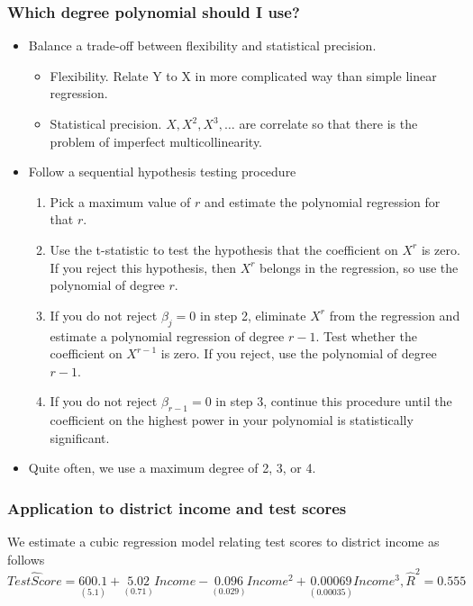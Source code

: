 \documentclass[a4paper,11pt]{article}
\begin{document}
\subsubsection*{Which degree polynomial should I use?}
\label{sec:orgbc950fd}
\begin{itemize}
\item Balance a trade-off between flexibility and statistical precision.
\begin{itemize}
\item Flexibility. Relate Y to X in more complicated way than simple
linear regression.
\item Statistical precision. \(X, X^2, X^3, \ldots\) are correlate so
that there is the problem of imperfect multicollinearity.
\end{itemize}
\item Follow a sequential hypothesis testing procedure
\begin{enumerate}
\item Pick a maximum value of \(r\) and estimate the polynomial
regression for that \(r\).
\item Use the t-statistic to test the hypothesis that the coefficient
on \(X^r\) is zero. If you reject this hypothesis, then \(X^r\)
belongs in the regression, so use the polynomial of degree \(r\).
\item If you do not reject \(\beta_j = 0\) in step 2, eliminate \(X^r\)
from the regression and estimate a polynomial regression of
degree \(r-1\). Test whether the coefficient on \(X^{r-1}\) is
zero. If you reject, use the polynomial of degree \(r-1\).
\item If you do not reject \(\beta_{r-1} = 0\) in step 3, continue this
procedure until the coefficient on the highest power in your
polynomial is statistically significant.
\end{enumerate}
\item Quite often, we use a maximum degree of 2, 3, or 4.
\end{itemize}

\subsubsection*{Application to district income and test scores}
\label{sec:orgb540783}
We estimate a cubic regression model relating test scores to district
income as follows
\begin{equation*}
\widehat{TestScore} = \underset{\displaystyle (5.1)}{600.1} 
                    + \underset{\displaystyle (0.71)}{5.02} Income
                    - \underset{\displaystyle (0.029)}{0.096} Income^2 
                    + \underset{\displaystyle (0.00035)}{0.00069} Income^3, \hat{R}^2 = 0.555 
\end{equation*}
\end{document}
